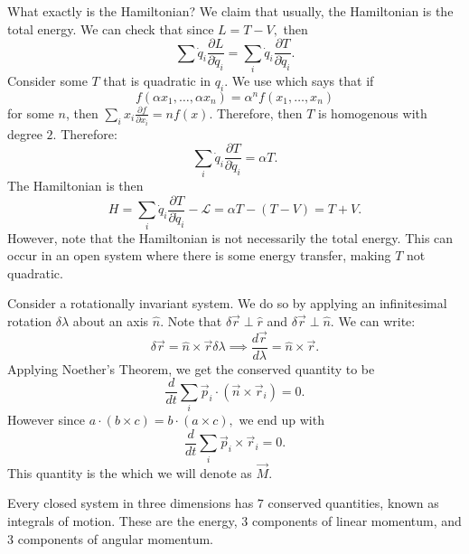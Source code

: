 \documentclass{article}
\numberwithin{equation}{section}
\begin{document}
What exactly is the Hamiltonian? We claim that usually, the Hamiltonian is the total energy. We can check that since $L=T-V,$ then 
\begin{equation*}
    \sum \dot{q}_i \frac{\partial L}{\partial \dot{q}_i} = \sum_i \dot{q}_i \frac{\partial T}{\partial \dot{q}_i}.
\end{equation*}
Consider some $T$ that is quadratic in $q_i$. We use  which says that if
\begin{equation*}
    f(\alpha x_1, \dots, \alpha x_n) = \alpha^n f(x_1,\dots,x_n)
\end{equation*}
for some $n$, then $\sum_i x_i \frac{\partial f}{\partial x_i} = n f(x).$ Therefore, then $T$ is homogenous with degree $2$. Therefore:
\begin{equation}
    \sum_i \dot{q}_i \frac{\partial T}{\partial \dot{q}_i} = \alpha T.
\end{equation}
The Hamiltonian is then
\begin{equation*}
    H = \sum_i \dot{q}_i \frac{\partial T}{\partial \dot{q}_i} - \mathcal{L} = \alpha T - (T-V) = T+V.
\end{equation*}
However, note that the Hamiltonian is not necessarily the total energy. This can occur in an open system where there is some energy transfer, making $T$ not quadratic.
\begin{example}
    Consider a rotationally invariant system. We do so by applying an infinitesimal rotation $\delta \lambda$ about an axis $\hat{n}.$ Note that $\delta \vec{r} \perp \hat{r}$ and $\delta \vec{r} \perp \hat{n}.$ We can write:
    \begin{equation*}
        \delta \vec{r} = \hat{n} \times \vec{r} \delta\lambda \implies \frac{d\vec{r}}{d\lambda} = \hat{n} \times \vec{r}.
    \end{equation*}
    Applying Noether's Theorem, we get the conserved quantity to be
    \begin{equation*}
        \frac{d}{dt} \sum_i \vec{p}_i \cdot (\vec{n}\times \vec{r}_i) = 0.
    \end{equation*}
    However since $a\cdot (b\times c) = b \cdot (a\times c),$ we end up with
    \begin{equation*}
        \frac{d}{dt} \sum_i \vec{p}_i \times \vec{r}_i = 0.
    \end{equation*}
    This quantity is the  which we will denote as $\vec{M}$.
\end{example}
Every closed system in three dimensions has $7$ conserved quantities, known as integrals of motion. These are the energy, 3 components of linear momentum, and 3 components of angular momentum.
\end{document}
